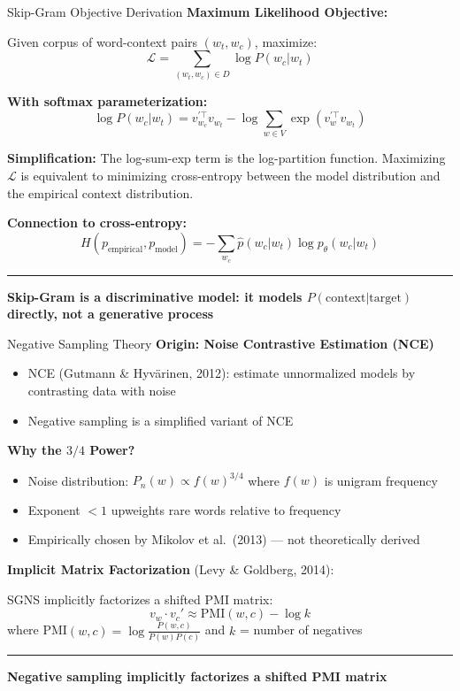 \documentclass[8pt,aspectratio=169]{beamer}
\newcommand{\bottomnote}[1]{%
\vfill
\vspace{-2mm}
\textcolor{mllavender2}{\rule{\textwidth}{0.4pt}}
\vspace{1mm}
\footnotesize
\textbf{#1}
}
\begin{document}
\begin{frame}[t]{Skip-Gram Objective Derivation}
\textbf{Maximum Likelihood Objective:}

Given corpus of word-context pairs $(w_t, w_c)$, maximize:
\[
\mathcal{L} = \sum_{(w_t, w_c) \in D} \log P(w_c | w_t)
\]

\textbf{With softmax parameterization:}
\[
\log P(w_c | w_t) = v_{w_c}^{\prime\top} v_{w_t} - \log \sum_{w \in V} \exp(v_w^{\prime\top} v_{w_t})
\]

\textbf{Simplification:} The log-sum-exp term is the log-partition function. Maximizing $\mathcal{L}$ is equivalent to minimizing cross-entropy between the model distribution and the empirical context distribution.

\vspace{0.3em}
\textbf{Connection to cross-entropy:}
\[
H(p_{\text{empirical}}, p_{\text{model}}) = -\sum_{w_c} \hat{p}(w_c | w_t) \log p_\theta(w_c | w_t)
\]
\bottomnote{Skip-Gram is a discriminative model: it models $P(\text{context}|\text{target})$ directly, not a generative process}
\end{frame}

\begin{frame}[t]{Negative Sampling Theory}
\textbf{Origin: Noise Contrastive Estimation (NCE)}
\begin{itemize}
\item NCE (Gutmann \& Hyv\"arinen, 2012): estimate unnormalized models by contrasting data with noise
\item Negative sampling is a simplified variant of NCE
\end{itemize}
\vspace{0.3em}
\textbf{Why the $3/4$ Power?}
\begin{itemize}
\item Noise distribution: $P_n(w) \propto f(w)^{3/4}$ where $f(w)$ is unigram frequency
\item Exponent $< 1$ upweights rare words relative to frequency
\item Empirically chosen by Mikolov et al.\ (2013) --- not theoretically derived
\end{itemize}
\vspace{0.3em}
\textbf{Implicit Matrix Factorization} (Levy \& Goldberg, 2014):

SGNS implicitly factorizes a shifted PMI matrix:
\[
v_w \cdot v_c' \approx \text{PMI}(w, c) - \log k
\]
where PMI$(w,c) = \log \frac{P(w,c)}{P(w)P(c)}$ and $k$ = number of negatives
\bottomnote{Negative sampling implicitly factorizes a shifted PMI matrix}
\end{frame}
\end{document}
